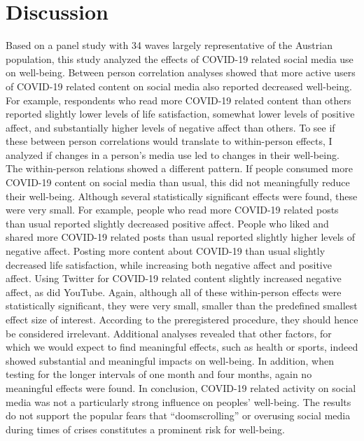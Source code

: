 \documentclass[
  man,mask,floatsintext]{apa7}
\begin{document}
\hypertarget{discussion}{%
\section{Discussion}\label{discussion}}

Based on a panel study with 34 waves largely representative of the Austrian population, this study analyzed the effects of COVID-19 related social media use on well-being.
Between person correlation analyses showed that more active users of COVID-19 related content on social media also reported decreased well-being.
For example, respondents who read more COVID-19 related content than others reported slightly lower levels of life satisfaction, somewhat lower levels of positive affect, and substantially higher levels of negative affect than others.
To see if these between person correlations would translate to within-person effects, I analyzed if changes in a person's media use led to changes in their well-being.
The within-person relations showed a different pattern.
If people consumed more COVID-19 content on social media than usual, this did not meaningfully reduce their well-being.
Although several statistically significant effects were found, these were very small.
For example, people who read more COVID-19 related posts than usual reported slightly decreased positive affect.
People who liked and shared more COVID-19 related posts than usual reported slightly higher levels of negative affect.
Posting more content about COVID-19 than usual slightly decreased life satisfaction, while increasing both negative affect and positive affect.
Using Twitter for COVID-19 related content slightly increased negative affect, as did YouTube.
Again, although all of these within-person effects were statistically significant, they were very small, smaller than the predefined smallest effect size of interest.
According to the preregistered procedure, they should hence be considered irrelevant.
Additional analyses revealed that other factors, for which we would expect to find meaningful effects, such as health or sports, indeed showed substantial and meaningful impacts on well-being.
In addition, when testing for the longer intervals of one month and four months, again no meaningful effects were found.
In conclusion, COVID-19 related activity on social media was not a particularly strong influence on peoples' well-being.
The results do not support the popular fears that ``doomscrolling'' or overusing social media during times of crises constitutes a prominent risk for well-being.
\end{document}
